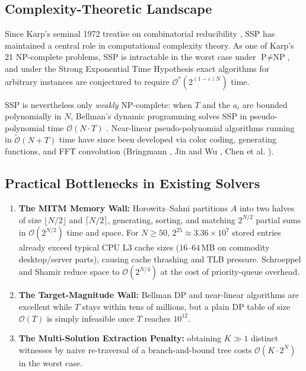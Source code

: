\documentclass[journal,onecolumn,11pt]{IEEEtran}
\begin{document}
\subsection{Complexity-Theoretic Landscape}
Since Karp's seminal 1972 treatise on combinatorial reducibility \cite{karp1972reducibility}, SSP has maintained a central role in computational complexity theory. As one of Karp's 21 NP-complete problems, SSP is intractable in the worst case under $\text{P} \neq \text{NP}$, and under the Strong Exponential Time Hypothesis exact algorithms for arbitrary instances are conjectured to require $\mathcal{O}^*(2^{(1-\varepsilon)N})$ time.

SSP is nevertheless only \textit{weakly} NP-complete: when $T$ and the $a_i$ are bounded polynomially in $N$, Bellman's dynamic programming solves SSP in pseudo-polynomial time $\mathcal{O}(N \cdot T)$ \cite{pisinger1997minimal}. Near-linear pseudo-polynomial algorithms running in $\widetilde{\mathcal{O}}(N + T)$ time have since been developed via color coding, generating functions, and FFT convolution (Bringmann \cite{bringmann2017near}, Jin and Wu \cite{jin2019simple}, Chen et al. \cite{chen2024improved}).

\subsection{Practical Bottlenecks in Existing Solvers}
\begin{enumerate}
    \item \textbf{The MITM Memory Wall:} Horowitz--Sahni \cite{horowitz1974computing} partitions $A$ into two halves of size $\lfloor N/2 \rfloor$ and $\lceil N/2 \rceil$, generating, sorting, and matching $2^{N/2}$ partial sums in $\mathcal{O}(2^{N/2})$ time and space. For $N \ge 50$, $2^{25} \approx 3.36 \times 10^7$ stored entries already exceed typical CPU L3 cache sizes ($16$--$64$\,MB on commodity desktop/server parts), causing cache thrashing and TLB pressure. Schroeppel and Shamir \cite{schroeppel1981t} reduce space to $\mathcal{O}(2^{N/4})$ at the cost of priority-queue overhead.
    \item \textbf{The Target-Magnitude Wall:} Bellman DP and near-linear algorithms are excellent while $T$ stays within tens of millions, but a plain DP table of size $\mathcal{O}(T)$ is simply infeasible once $T$ reaches $10^{12}$.
    \item \textbf{The Multi-Solution Extraction Penalty:} obtaining $K \gg 1$ distinct witnesses by naive re-traversal of a branch-and-bound tree costs $\mathcal{O}(K \cdot 2^N)$ in the worst case.
\end{enumerate}
\end{document}
